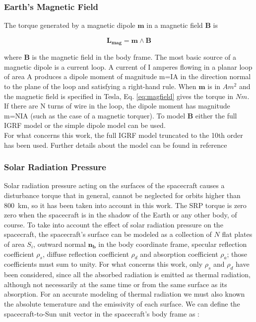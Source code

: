 \subsubsection{Earth's Magnetic Field}
The torque generated by a magnetic dipole $\textbf{m}$ in a magnetic field $\textbf{B}$ is

\begin{equation}
 \mathbf{L_{mag}} = \mathbf{m} \wedge \mathbf{B}
 \label{eq:magfield}
\end{equation}

where $\mathbf{B}$ is the magnetic field in the body frame.
The most basic source of a magnetic dipole is a current loop. A current of I amperes flowing in a planar loop of area A produces a dipole moment of magnitude m=IA in the direction normal to the plane of the loop and satisfying a right-hand rule.
When $\textbf{m}$ is in $Am^2$ and the magnetic field is specified in Tesla, Eq. \ref{eq:magfield} gives the torque in $Nm$. If there are N turns of wire in the loop, the dipole moment has magnitude m=NIA (such as the case of a magnetic torquer).
To model $\textbf{B}$ either the full IGRF model or the simple dipole model can be used.\\
For what concerns this work, the full IGRF model truncated to the 10th order has been used. Further details about the model can be found in reference \cite{Davis2014}

\subsubsection{Solar Radiation Pressure}
Solar radiation pressure acting on the surfaces of the spacecraft causes a disturbance torque that in general, cannot be neglected for orbits higher than \SI{800}{\kilo\meter}, so it has been taken into account in this work.
The SRP torque is zero zero when the spacecraft is in the shadow of the Earth or any other body, of course.
To take into account the effect of solar radiation pressure on the spacecraft, the spacecraft's surface can be modeled as a collection of $N$ flat plates of area $S_{i}$, outward normal $\mathbf{n_{b}}$ in the body coordinate frame, specular reflection coefficient $\rho_s$, diffuse reflection coefficient $\rho_{d}$ and absorption coefficient $\rho_{a}$; those coefficients must sum to unity.
For what concerns this work, only $\rho_s$ and $\rho_d$ have been considered, since all the absorbed radiation is emitted as thermal radiation,  although not necessarily at the same time or from the same surface as its absorption.
For an accurate modeling of thermal radiation we must also known the absolute temerature and the emissivity of each surface.
We can define the spacecraft-to-Sun unit vector in the spacecraft's body frame as : 

